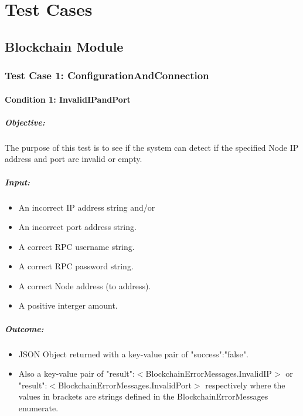 \documentclass[11pt]{article}
\begin{document}
	
	\section{Test Cases}
	\subsection{Blockchain Module}
	\label{sec:BlockchainModuleTestCases}
	\subsubsection{Test Case 1: ConfigurationAndConnection}
	\paragraph{Condition 1: InvalidIPandPort}	
	\subparagraph{Objective:}
	The purpose of this test is to see if the system can detect if the specified Node IP address and port are invalid or empty.
	\subparagraph{Input:}
	\begin{itemize}
		\item An incorrect IP address string and/or
		\item An incorrect port address string.
		\item A correct RPC username string.
		\item A correct RPC password string.
		\item A correct Node address (to address).
		\item A positive interger amount.
	\end{itemize}
	\subparagraph{Outcome:}
	\begin{itemize}
		\item JSON Object returned with a key-value pair of "success":"false".
		\item Also a key-value pair of "result":$<$BlockchainErrorMessages.InvalidIP$>$ or "result":$<$BlockchainErrorMessages.InvalidPort$>$ respectively where the values in brackets are strings defined in the BlockchainErrorMessages enumerate.
	\end{itemize}
	
\end{document}
